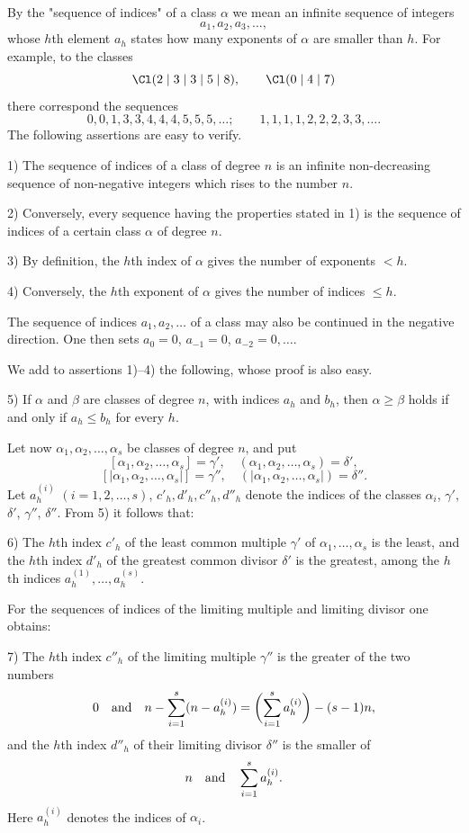 By the "sequence of indices" of a class $\alpha$ we mean an infinite sequence of integers
\[
 a_1,a_2,a_3,\ldots,
\]
whose $h$th element $a_h$ states how many exponents of $\alpha$ are smaller than $h$. For example, to the classes
\[
 \Cl(2\mid3\mid3\mid5\mid8),\qquad \Cl(0\mid4\mid7)
\]
there correspond the sequences
\[
 0,0,1,3,3,4,4,4,5,5,5,\ldots;
 \qquad
 1,1,1,1,2,2,2,3,3,\ldots.
\]
The following assertions are easy to verify.

1) The sequence of indices of a class of degree $n$ is an infinite non-decreasing sequence of non-negative integers which rises to the number $n$.

2) Conversely, every sequence having the properties stated in 1) is the sequence of indices of a certain class $\alpha$ of degree $n$.

3) By definition, the $h$th index of $\alpha$ gives the number of exponents $<h$.

4) Conversely, the $h$th exponent of $\alpha$ gives the number of indices $\le h$.

The sequence of indices $a_1,a_2,\ldots$ of a class may also be continued in the negative direction. One then sets $a_0=0$, $a_{-1}=0$, $a_{-2}=0,
\ldots$.

We add to assertions 1)--4) the following, whose proof is also easy.

5) If $\alpha$ and $\beta$ are classes of degree $n$, with indices $a_h$ and $b_h$, then $\alpha\ge\beta$ holds if and only if $a_h\le b_h$ for every $h$.

Let now $\alpha_1,
\alpha_2,
\ldots,
\alpha_s$ be classes of degree $n$, and put
\[
 [\alpha_1,\alpha_2,\ldots,\alpha_s]=\gamma',\quad
 (\alpha_1,\alpha_2,\ldots,\alpha_s)=\delta',
\]
\[
 [|\alpha_1,\alpha_2,\ldots,\alpha_s|]=\gamma'',\quad
 (|\alpha_1,\alpha_2,\ldots,\alpha_s|)=\delta''.
\]
Let $a_h^{(i)}$ $(i=1,2,\ldots,s)$, $c'_h,d'_h,c''_h,d''_h$ denote the indices of the classes $\alpha_i$, $\gamma'$, $\delta'$, $\gamma''$, $\delta''$. From 5) it follows that:

6) The $h$th index $c'_h$ of the least common multiple $\gamma'$ of $\alpha_1,
\ldots,\alpha_s$ is the least, and the $h$th index $d'_h$ of the greatest common divisor $\delta'$ is the greatest, among the $h$th indices $a_h^{(1)},\ldots,a_h^{(s)}$.

For the sequences of indices of the limiting multiple and limiting divisor one obtains:

7) The $h$th index $c''_h$ of the limiting multiple $\gamma''$ is the greater of the two numbers
\[
 0\quad\hbox{and}\quad n-\sum_{i=1}^s(n-a_h^{(i)})=\biggl(\sum_{i=1}^s a_h^{(i)}\biggr)-(s-1)n,
\]
and the $h$th index $d''_h$ of their limiting divisor $\delta''$ is the smaller of
\[
 n\quad\hbox{and}\quad \sum_{i=1}^s a_h^{(i)}.
\]
Here $a_h^{(i)}$ denotes the indices of $\alpha_i$.

